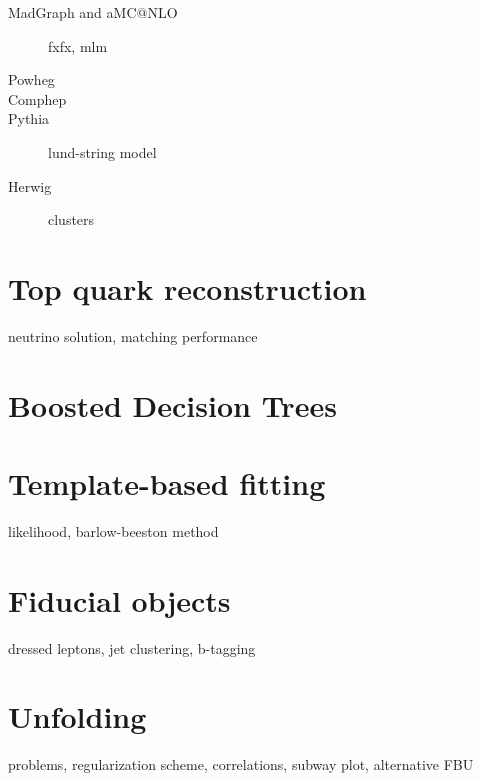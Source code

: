 \begin{description}
\item[MadGraph and aMC{@}NLO] fxfx, mlm

\item[Powheg]

\item[Comphep]

\item[Pythia] lund-string model

\item[Herwig] clusters

\end{description}


\section{Top quark reconstruction}

neutrino solution, matching performance

\section{Boosted Decision Trees}
\cite{Hocker:2007ht}

\section{Template-based fitting}

likelihood, barlow-beeston method

\section{Fiducial objects}

dressed leptons, jet clustering, b-tagging

\section{Unfolding}

problems, regularization scheme, correlations, subway plot, alternative FBU
